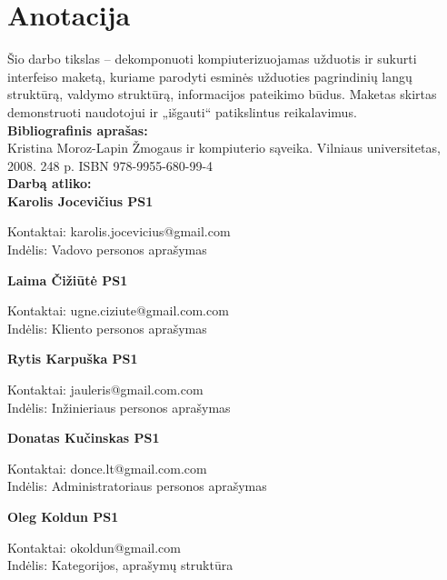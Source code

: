 

\newcommand{\anotacijaIndelis}[3]{
	\textbf{#1}
	\begin{flushleft}
	\hspace*{1cm}
	Kontaktai: #2
	\\
	\hspace*{1cm}
	Indėlis: #3
	\end{flushleft}
}

\newcommand{\anotacija}[2]{
	\textbf{#1}
	\begin{flushleft}
	\hspace*{1cm}
	Kontaktai: #2
	\end{flushleft}
}

\section*{Anotacija}

		Šio darbo tikslas – dekomponuoti kompiuterizuojamas užduotis ir sukurti interfeiso maketą, kuriame parodyti esminės užduoties pagrindinių langų struktūrą, valdymo struktūrą, informacijos pateikimo būdus. 
		Maketas skirtas demonstruoti naudotojui ir „išgauti“ patikslintus reikalavimus. \\
		
		\textbf{Bibliografinis aprašas:}\\
		Kristina Moroz-Lapin Žmogaus ir kompiuterio sąveika. Vilniaus universitetas, 2008. 248 p. ISBN 978-9955-680-99-4
		\\
		
		\textbf{Darbą atliko:}\\

		\anotacijaIndelis{Karolis Jocevičius PS1}{karolis.jocevicius@gmail.com}{Vadovo personos aprašymas}
		
		\anotacijaIndelis{Laima Čižiūtė PS1}{ugne.ciziute@gmail.com.com}{Kliento personos aprašymas}
		
		\anotacijaIndelis{Rytis Karpuška PS1}{jauleris@gmail.com.com}{Inžinieriaus personos aprašymas}

		\anotacijaIndelis{Donatas Kučinskas PS1}{donce.lt@gmail.com.com}{Administratoriaus personos aprašymas}

		\anotacijaIndelis{Oleg Koldun PS1}{okoldun@gmail.com}{Kategorijos, aprašymų struktūra}